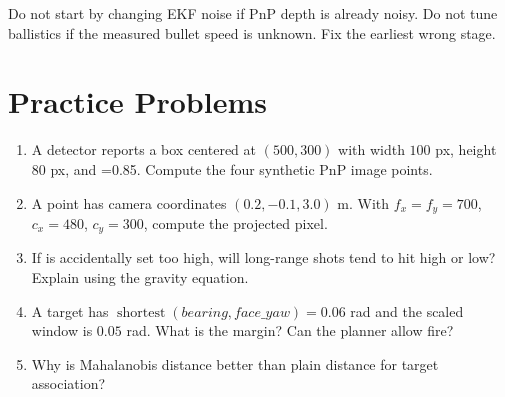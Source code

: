 Do not start by changing EKF noise if PnP depth is already noisy. Do not tune
ballistics if the measured bullet speed is unknown. Fix the earliest wrong
stage.

\section{Practice Problems}

\begin{enumerate}
  \item A detector reports a box centered at $(500,300)$ with width $100$ px,
  height $80$ px, and =0.85. Compute the four synthetic PnP
  image points.
  \item A point has camera coordinates $(0.2, -0.1, 3.0)$ m. With
  $f_x=f_y=700$, $c_x=480$, $c_y=300$, compute the projected pixel.
  \item If  is accidentally set too high, will long-range
  shots tend to hit high or low? Explain using the gravity equation.
  \item A target has $\operatorname{shortest}(bearing, face\_yaw)=0.06$ rad and
  the scaled window is $0.05$ rad. What is the margin? Can the planner allow
  fire?
  \item Why is Mahalanobis distance better than plain distance for target
  association?
\end{enumerate}
